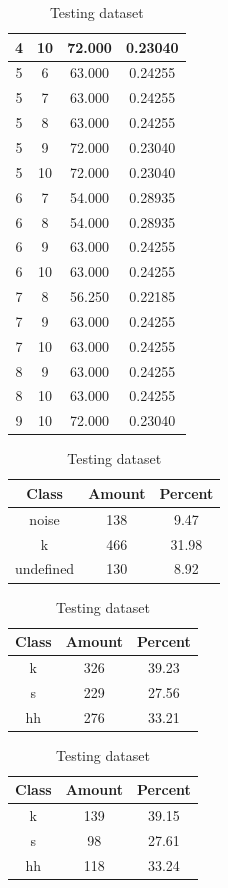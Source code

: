 \begin{table}
\begin{subtable}[h]{0.45\textwidth}
{\begin{tabular}{|c|c|c|c|}
 4 & 10 & 72.000 & 0.23040\\ \hline 
 5 & 6 & 63.000 & 0.24255\\ \hline 
 5 & 7 & 63.000 & 0.24255\\ \hline 
 5 & 8 & 63.000 & 0.24255\\ \hline 
 5 & 9 & 72.000 & 0.23040\\ \hline 
 5 & 10 & 72.000 & 0.23040\\ \hline 
 6 & 7 & 54.000 & 0.28935\\ \hline 
 6 & 8 & 54.000 & 0.28935\\ \hline 
 6 & 9 & 63.000 & 0.24255\\ \hline 
 6 & 10 & 63.000 & 0.24255\\ \hline 
 7 & 8 & 56.250 & 0.22185\\ \hline 
 7 & 9 & 63.000 & 0.24255\\ \hline 
 7 & 10 & 63.000 & 0.24255\\ \hline 
 8 & 9 & 63.000 & 0.24255\\ \hline 
 8 & 10 & 63.000 & 0.24255\\ \hline 
 9 & 10 & 72.000 & 0.23040\\ \hline 

\end{tabular}
}\caption{xcsflux105}\label{xlsflux105}

\end{subtable}

\begin{subtable}[h]{0.45\textwidth}
\centering
\begin{tabular}{|c|c|c|}
\hline
Class & Amount & Percent\\ \hline
noise & 138 & 9.47\\ \hline
k & 466 & 31.98\\ \hline
undefined & 130 & 8.92\\ \hline
\end{tabular}
\caption{Entire dataset after stripping short sounds}
\end{subtable}
\hfill
\begin{subtable}[h]{0.45\textwidth}
\centering
\begin{tabular}{|c|c|c|}
\hline
Class & Amount & Percent\\ \hline
k & 326 & 39.23\\ \hline
s & 229 & 27.56\\ \hline
hh & 276 & 33.21\\ \hline
\end{tabular}
\caption{Training dataset}
\end{subtable}
\hfill
\begin{subtable}[h]{0.45\textwidth}
\centering
\begin{tabular}{|c|c|c|}
\hline
Class & Amount & Percent\\ \hline
k & 139 & 39.15\\ \hline
s & 98 & 27.61\\ \hline
hh & 118 & 33.24\\ \hline
\end{tabular}
\caption{Testing dataset}
\end{subtable}
\hfill



\end{table}

